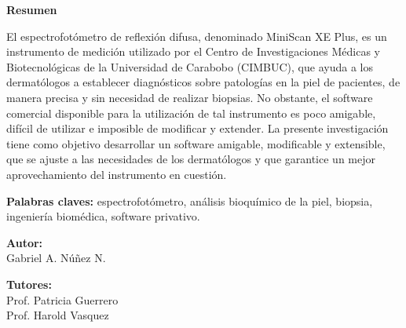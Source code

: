 
\begin{center}
	\membrete
	\vfill
	\textbf{Resumen}
\end{center}

	\noindent
El espectrofot\'{o}metro de reflexi\'{o}n difusa, denominado MiniScan XE Plus, es un instrumento de medici\'{o}n utilizado por el Centro de Investigaciones M\'{e}dicas y Biotecnol\'{o}gicas de la Universidad de Carabobo (CIMBUC), que ayuda a los dermat\'{o}logos a establecer diagn\'{o}sticos sobre patolog\'{i}as en la piel de pacientes, de manera precisa y sin necesidad de realizar biopsias. No obstante, el software comercial disponible para la utilizaci\'{o}n de tal instrumento es poco amigable, dif\'{i}cil de utilizar e imposible de modificar y extender. La presente investigaci\'{o}n tiene como objetivo desarrollar un software amigable, modificable y extensible, que se ajuste a las necesidades de los dermat\'{o}logos y que garantice un mejor aprovechamiento del instrumento en cuesti\'{o}n.

	\noindent
	\textbf{Palabras claves:} espectrofot\'{o}metro, an\'{a}lisis bioqu\'{i}mico de la piel, biopsia, ingenier\'{i}a biom\'{e}dica, software privativo.

\vfill
\begin{minipage}[t]{0.45\textwidth}
	\begin{flushleft}
		\begin{center}
			\textbf{Autor:} \\
			Gabriel A. N\'{u}\~{n}ez N.
		\end{center}
	\end{flushleft}
\end{minipage}
\begin{minipage}[t]{0.45\textwidth}
	\begin{flushright}
		\begin{center}
			\textbf{Tutores:} \\
			Prof. Patricia Guerrero \\
			Prof. Harold Vasquez
		\end{center}
	\end{flushright}
\end{minipage}
\vfill